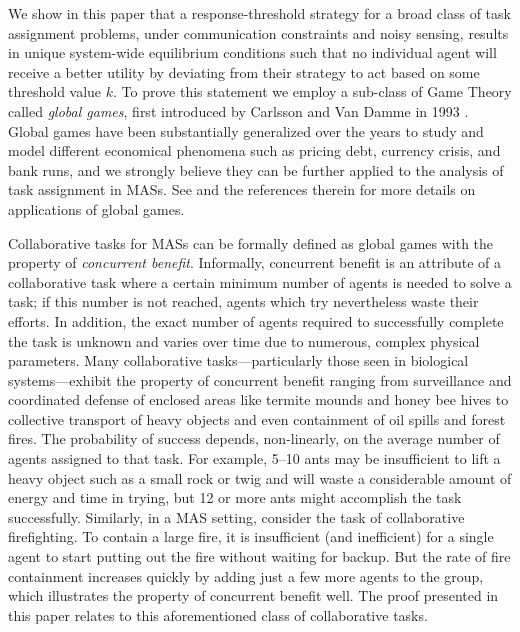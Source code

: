 \documentclass[conference]{ieeeconf}
\begin{document}
We show in this paper that a response-threshold strategy for a broad class of task assignment problems, under communication constraints  and noisy sensing, results in unique system-wide equilibrium conditions such that no individual agent will receive a better utility by deviating from their strategy to act based on some threshold value $k$. To prove this statement we employ a sub-class of Game Theory called \emph{global games}, first introduced by Carlsson and Van Damme in 1993 \cite{Carlsson1993}. Global games have been substantially generalized over the years to study and model different economical phenomena such as pricing debt, currency crisis, and bank runs, and we strongly believe they can be further applied to the analysis of task assignment in MASs. See \cite{Morris2000} and the references therein for more details on applications of global games.

Collaborative tasks for MASs can be formally defined as global games with the property of \emph{concurrent benefit}. Informally, concurrent benefit is an attribute of a collaborative task where a certain minimum number of agents is needed to solve a task; if this number is not reached, agents which try nevertheless waste their efforts. In addition, the exact number of agents required to successfully complete the task is unknown and varies over time due to numerous, complex physical parameters. Many collaborative tasks---particularly those seen in biological systems---exhibit the property of concurrent benefit ranging from surveillance and coordinated defense of enclosed areas like termite mounds and honey bee hives \cite{Breed1990} to collective transport of heavy objects and even containment of oil spills and forest fires. The probability of success depends, non-linearly, on the average number of agents assigned to that task. For example, 5--10 ants may be insufficient to lift a heavy object such as a small rock or twig and will waste a considerable amount of energy and time in trying, but 12 or more ants might accomplish the task successfully. Similarly, in a MAS setting, consider the task of collaborative firefighting. To contain a large fire, it is insufficient (and inefficient) for a single agent to start putting out the fire without waiting for backup. But the rate of fire containment increases quickly by adding just a few more agents to the group, which illustrates the property of concurrent benefit well. The proof presented in this paper relates to this aforementioned class of collaborative tasks.
\end{document}
